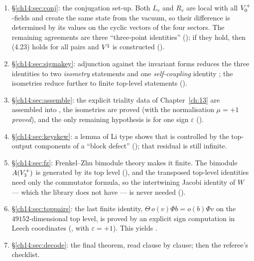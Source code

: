 \begin{enumerate}[label=(\arabic*)]
\item \S\ref{ch14:sec:conj}: the conjugation set-up.  Both $L_v$ and $R_v$ are local with all
  $V_0^{+}$-fields and create the same state from the vacuum, so their difference is determined by
  its values on the cyclic vectors of the four sectors.  The remaining agreements are three
  ``three-point identities'' (); if they hold, then (4.23) holds for all pairs and
  ${V^{\natural}}$ is constructed ().
\item \S\ref{ch14:sec:sigmakey}: adjunction against the invariant forms reduces the three
  identities to two \emph{isometry} statements and one \emph{self-coupling} identity
  ; the isometries reduce further to finite top-level statements
  ().
\item \S\ref{ch14:sec:assemble}: the explicit triality data of Chapter~\ref{ch:13} are assembled into
  , the isometries are proved (with the normalisation $\mu=+1$ \emph{proved}), and
  the only remaining hypothesis is  for one sign $\varepsilon$
  ().
\item \S\ref{ch14:sec:keyskew}: a lemma of Li type shows that  is controlled by the
  top-output components of a ``block defect'' (); that residual is still
  infinite.
\item \S\ref{ch14:sec:fz}: Frenkel--Zhu bimodule theory makes it finite.  The bimodule
  $A(V_3^{+})$ is generated by its top level (), and the transposed top-level
  identities need only the commutator formula, so the intertwining Jacobi identity of $W$ — which
  the library does not have — is never needed ().
\item \S\ref{ch14:sec:toppairs}: the last finite identity, $\Theta\,o(v)\Phi b=o(b)\Phi v$ on the
  $49152$-dimensional top level, is proved by an explicit sign computation in Leech coordinates
  (, with $\varepsilon=+1$).  This yields .
\item \S\ref{ch14:sec:decode}: the final theorem, read clause by clause; then the referee's
  checklist.
\end{enumerate}

